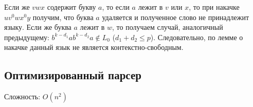 \documentclass[a4paper, 14pt]{extarticle}
\begin{document}
Если же $vwx$ содержит букву $a$, то если $a$ лежит в $v$ или $x$, то при накачке $uv^0wx^0y$ получим, что буква $a$ удаляется и полученное слово не принадлежит языку. Если же буква $a$ лежит в $w$, то получаем случай, аналогичный предыдущему: $b^{k-d_1}ab^{k-d_2}a \notin L_0$ ($d_1 + d_2 \leq p$).
Следовательно, по лемме о накачке данный язык не является контекстно-свободным.
\subsection{Оптимизированный парсер}

Сложность: $O(n^2)$
\end{document}
